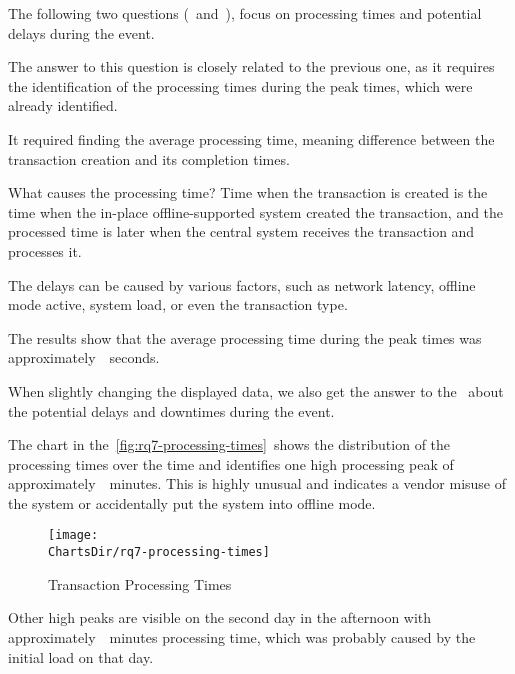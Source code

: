 The following two questions (~and~), focus on processing times and potential delays during the event.


The answer to this question is closely related to the previous one, as it requires the identification of the processing times during the peak times, which were already identified.

It required finding the average processing time, meaning difference between the transaction creation and its completion times.

\begin{infobox}{What causes the processing time?}
	Time when the transaction is created is the time when the in-place offline-supported system created the transaction, and the processed time is later when the central system receives the transaction and processes it.

	The delays can be caused by various factors, such as network latency, offline mode active, system load, or even the transaction type.
\end{infobox}

The results show that the average processing time during the peak times was approximately~~seconds.

When slightly changing the displayed data, we also get the answer to the~ about the potential delays and downtimes during the event.


The chart in the~\autoref{fig:rq7-processing-times}~shows the distribution of the processing times over the time and identifies one high processing peak of approximately~~minutes.
This is highly unusual and indicates a vendor misuse of the system or accidentally put the system into offline mode.

\begin{figure}[H]
	\centering
	\texttt{[image: \\ChartsDir/rq7-processing-times]}
	\caption{ Transaction Processing Times}
	\label{fig:rq7-processing-times}
	\source
\end{figure}

Other high peaks are visible on the second day in the afternoon with approximately~~minutes processing time, which was probably caused by the initial load on that day.

